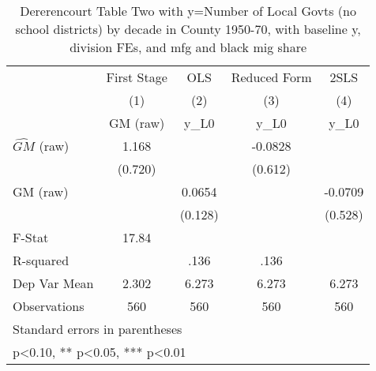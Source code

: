 \begin{table}[htbp]\centering
\def\sym#1{\ifmmode^{#1}\else\(^{#1}\)\fi}
\caption{Dererencourt Table Two with y=Number of Local Govts (no school districts) by decade in County 1950-70, with baseline y, division FEs, and mfg and black mig share}
\begin{tabular}{l*{4}{c}}
\toprule
                    & First Stage   &         OLS   &Reduced Form   &        2SLS   \\
                    &\multicolumn{1}{c}{(1)}&\multicolumn{1}{c}{(2)}&\multicolumn{1}{c}{(3)}&\multicolumn{1}{c}{(4)}\\
                    &\multicolumn{1}{c}{GM  (raw)}&\multicolumn{1}{c}{y\_L0}&\multicolumn{1}{c}{y\_L0}&\multicolumn{1}{c}{y\_L0}\\
\midrule
$\hat{GM}$ (raw)    &       1.168   &               &     -0.0828   &               \\
                    &     (0.720)   &               &     (0.612)   &               \\
\addlinespace
GM  (raw)           &               &      0.0654   &               &     -0.0709   \\
                    &               &     (0.128)   &               &     (0.528)   \\
\midrule
F-Stat              &       17.84   &               &               &               \\
R-squared           &               &        .136   &        .136   &               \\
Dep Var Mean        &       2.302   &       6.273   &       6.273   &       6.273   \\
Observations        &         560   &         560   &         560   &         560   \\
\bottomrule
\multicolumn{5}{l}{\footnotesize Standard errors in parentheses}\\
\multicolumn{5}{l}{\footnotesize * p<0.10, ** p<0.05, *** p<0.01}\\
\end{tabular}
\end{table}
